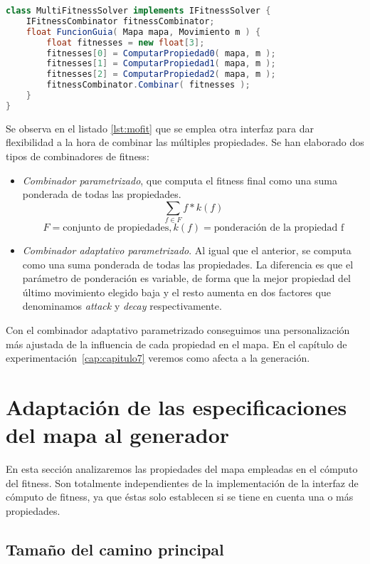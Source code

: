 \begin{lstlisting}[caption={Interfaz de selección de movimiento basada en búsqueda},label={lst:igsf},language=Java,escapechar=|]
class MultiFitnessSolver implements IFitnessSolver {
	IFitnessCombinator fitnessCombinator;
	float FuncionGuia( Mapa mapa, Movimiento m ) {
		float fitnesses = new float[3];
		fitnesses[0] = ComputarPropiedad0( mapa, m );
		fitnesses[1] = ComputarPropiedad1( mapa, m );
		fitnesses[2] = ComputarPropiedad2( mapa, m );
		fitnessCombinator.Combinar( fitnesses );
	}
}
\end{lstlisting}

Se observa en el listado \ref{lst:mofit} que se emplea otra interfaz para dar flexibilidad a la hora de combinar las múltiples propiedades. Se han elaborado dos tipos de combinadores de fitness:

\begin{itemize}
	\item \emph{Combinador parametrizado}, que computa el fitness final como una suma ponderada de todas las propiedades.
		$$ \sum_{f \in F} f * k(f)$$
		$$F = \text{conjunto de propiedades}, k(f) = \text{ponderación de la propiedad f} $$
	\item \emph{Combinador adaptativo parametrizado}. Al igual que el anterior, se computa como una suma ponderada de todas las propiedades. La diferencia es que el parámetro de ponderación es variable, de forma que la mejor propiedad del último movimiento elegido baja y el resto aumenta en dos factores que denominamos \emph{attack} y \emph{decay} respectivamente.
\end{itemize}

Con el combinador adaptativo parametrizado conseguimos una personalización más ajustada de la influencia de cada propiedad en el mapa. En el capítulo de experimentación~\ref{cap:capitulo7} veremos como afecta a la generación.

\section{Adaptación de las especificaciones del mapa al generador}

En esta sección analizaremos las propiedades del mapa empleadas en el cómputo del fitness. Son totalmente independientes de la implementación de la interfaz de cómputo de fitness, ya que éstas solo establecen si se tiene en cuenta una o más propiedades.

\subsection{Tamaño del camino principal}

